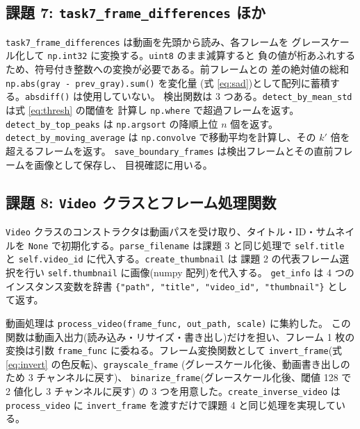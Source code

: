 \subsection{課題 7: {\tt task7\_frame\_differences} ほか}

{\tt task7\_frame\_differences} は動画を先頭から読み、各フレームを
グレースケール化して {\tt np.int32} に変換する。{\tt uint8} のまま減算すると
負の値が桁あふれするため、符号付き整数への変換が必要である。前フレームとの
差の絶対値の総和 {\tt np.abs(gray - prev\_gray).sum()} を変化量
(式 \ref{eq:sad})として配列に蓄積する。{\tt absdiff()} は使用していない。
検出関数は 3 つある。{\tt detect\_by\_mean\_std} は式 \ref{eq:thresh} の閾値を
計算し {\tt np.where} で超過フレームを返す。{\tt detect\_by\_top\_peaks} は
{\tt np.argsort} の降順上位 $n$ 個を返す。{\tt detect\_by\_moving\_average} は
{\tt np.convolve} で移動平均を計算し、その $k'$ 倍を超えるフレームを返す。
{\tt save\_boundary\_frames} は検出フレームとその直前フレームを画像として保存し、
目視確認に用いる。

\subsection{課題 8: {\tt Video} クラスとフレーム処理関数}

{\tt Video} クラスのコンストラクタは動画パスを受け取り、タイトル・ID・サムネイルを
{\tt None} で初期化する。{\tt parse\_filename} は課題 3 と同じ処理で
{\tt self.title} と {\tt self.video\_id} に代入する。{\tt create\_thumbnail} は
課題 2 の代表フレーム選択を行い {\tt self.thumbnail} に画像(numpy 配列)を代入する。
{\tt get\_info} は 4 つのインスタンス変数を辞書
{\tt \{"path", "title", "video\_id", "thumbnail"\}} として返す。

動画処理は {\tt process\_video(frame\_func, out\_path, scale)} に集約した。
この関数は動画入出力(読み込み・リサイズ・書き出し)だけを担い、フレーム 1 枚の
変換は引数 {\tt frame\_func} に委ねる。フレーム変換関数として
{\tt invert\_frame}(式 \ref{eq:invert} の色反転)、{\tt grayscale\_frame}
(グレースケール化後、動画書き出しのため 3 チャンネルに戻す)、
{\tt binarize\_frame}(グレースケール化後、閾値 128 で 2 値化し 3 チャンネルに戻す)
の 3 つを用意した。{\tt create\_inverse\_video} は {\tt process\_video} に
{\tt invert\_frame} を渡すだけで課題 4 と同じ処理を実現している。
